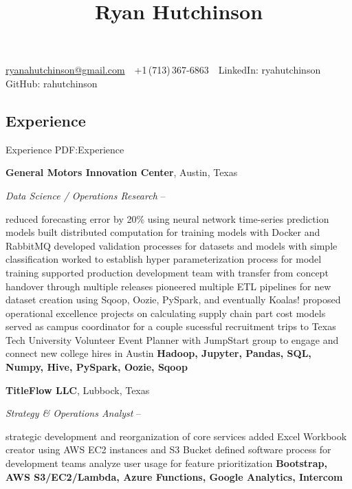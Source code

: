 \documentclass[a4paper,10pt,oneside]{article}
\begin{document}

\title{Ryan Hutchinson}

\begin{subtitle}

\par
\href{mailto:ryanahutchinson@gmail.com}
{ryanahutchinson@gmail.com}
\,\BulletSymbol\,
+1\,(713)\,367-6863
\,\BulletSymbol\,
LinkedIn: ryahutchinson
\BulletSymbol\,
GitHub: rahutchinson
\end{subtitle}

\begin{body}


\section
{Experience}
{Experience}
{PDF:Experience}

{\textbf{General Motors Innovation Center}},
Austin, Texas
\par
\Item
\textit{Data Science / Operations Research}
\hfill
{} --
\begin{detail}
\BulletItem
reduced forecasting error by 20\% using neural network time-series prediction models
\BulletItem
built distributed computation for training models with Docker and RabbitMQ
\BulletItem
developed validation processes for datasets and models with simple classification
\BulletItem
worked to establish hyper parameterization process for model training 
\BulletItem
supported production development team with transfer from concept handover through multiple releases
\BulletItem
pioneered multiple ETL pipelines for new dataset creation using Sqoop, Oozie, PySpark, and eventually Koalas!
\BulletItem
proposed operational excellence projects on calculating supply chain part cost models 
\BulletItem
served as campus coordinator for a couple sucessful recruitment trips to Texas Tech University
\BulletItem
Volunteer Event Planner with JumpStart group to engage and connect new college hires in Austin
\Item
\textbf{Hadoop, Jupyter, Pandas, SQL, Numpy, Hive, PySpark, Oozie, Sqoop}

\end{detail}
\SmallEntryGap
\SmallEntryGap
{\textbf{TitleFlow LLC}},
Lubbock, Texas
\par
\Item
\textit{Strategy \& Operations Analyst}
\hfill
{} --
\begin{detail}
\BulletItem
strategic development and reorganization of core services
\BulletItem
added Excel Workbook creator using AWS EC2 instances and S3 Bucket
\BulletItem
defined software process for development teams
\BulletItem
analyze user usage for feature prioritization
\Item
\textbf{Bootstrap, AWS S3/EC2/Lambda, Azure Functions, Google Analytics, Intercom}


\end{detail}
\end{body}
\end{document}
